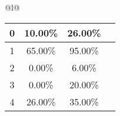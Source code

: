 \begin{longtable}{@{}l@{}}
\begin{minipage}{\textwidth}
\begin{tabular}{|c|c|c|c|}
0 & 10.00\% & 26.00\% & \textcolor{green}{\ding{51}} \\ \hline
1 & 65.00\% & 95.00\% & \textcolor{green}{\ding{51}} \\ \hline
2 & 0.00\% & 6.00\% & \textcolor{green}{\ding{51}} \\ \hline
3 & 0.00\% & 20.00\% & \textcolor{green}{\ding{51}} \\ \hline
4 & 26.00\% & 35.00\% & \textcolor{green}{\ding{51}} \\ \hline
\end{tabular}
\end{minipage}\\[2ex]
\end{longtable}